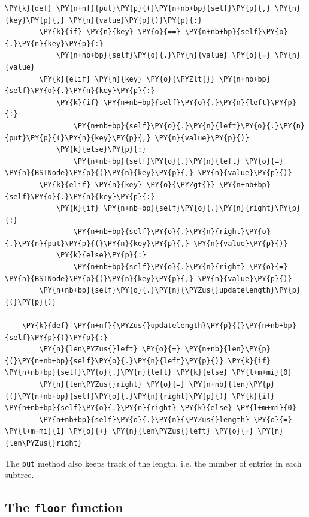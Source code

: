 \begin{Verbatim}[commandchars=\\\{\}]
    \PY{k}{def} \PY{n+nf}{put}\PY{p}{(}\PY{n+nb+bp}{self}\PY{p}{,} \PY{n}{key}\PY{p}{,} \PY{n}{value}\PY{p}{)}\PY{p}{:}
        \PY{k}{if} \PY{n}{key} \PY{o}{==} \PY{n+nb+bp}{self}\PY{o}{.}\PY{n}{key}\PY{p}{:}
            \PY{n+nb+bp}{self}\PY{o}{.}\PY{n}{value} \PY{o}{=} \PY{n}{value}
        \PY{k}{elif} \PY{n}{key} \PY{o}{\PYZlt{}} \PY{n+nb+bp}{self}\PY{o}{.}\PY{n}{key}\PY{p}{:}
            \PY{k}{if} \PY{n+nb+bp}{self}\PY{o}{.}\PY{n}{left}\PY{p}{:}
                \PY{n+nb+bp}{self}\PY{o}{.}\PY{n}{left}\PY{o}{.}\PY{n}{put}\PY{p}{(}\PY{n}{key}\PY{p}{,} \PY{n}{value}\PY{p}{)}
            \PY{k}{else}\PY{p}{:}
                \PY{n+nb+bp}{self}\PY{o}{.}\PY{n}{left} \PY{o}{=} \PY{n}{BSTNode}\PY{p}{(}\PY{n}{key}\PY{p}{,} \PY{n}{value}\PY{p}{)}
        \PY{k}{elif} \PY{n}{key} \PY{o}{\PYZgt{}} \PY{n+nb+bp}{self}\PY{o}{.}\PY{n}{key}\PY{p}{:}
            \PY{k}{if} \PY{n+nb+bp}{self}\PY{o}{.}\PY{n}{right}\PY{p}{:}
                \PY{n+nb+bp}{self}\PY{o}{.}\PY{n}{right}\PY{o}{.}\PY{n}{put}\PY{p}{(}\PY{n}{key}\PY{p}{,} \PY{n}{value}\PY{p}{)}
            \PY{k}{else}\PY{p}{:}
                \PY{n+nb+bp}{self}\PY{o}{.}\PY{n}{right} \PY{o}{=} \PY{n}{BSTNode}\PY{p}{(}\PY{n}{key}\PY{p}{,} \PY{n}{value}\PY{p}{)}
        \PY{n+nb+bp}{self}\PY{o}{.}\PY{n}{\PYZus{}updatelength}\PY{p}{(}\PY{p}{)}

    \PY{k}{def} \PY{n+nf}{\PYZus{}updatelength}\PY{p}{(}\PY{n+nb+bp}{self}\PY{p}{)}\PY{p}{:}
        \PY{n}{len\PYZus{}left} \PY{o}{=} \PY{n+nb}{len}\PY{p}{(}\PY{n+nb+bp}{self}\PY{o}{.}\PY{n}{left}\PY{p}{)} \PY{k}{if} \PY{n+nb+bp}{self}\PY{o}{.}\PY{n}{left} \PY{k}{else} \PY{l+m+mi}{0}
        \PY{n}{len\PYZus{}right} \PY{o}{=} \PY{n+nb}{len}\PY{p}{(}\PY{n+nb+bp}{self}\PY{o}{.}\PY{n}{right}\PY{p}{)} \PY{k}{if} \PY{n+nb+bp}{self}\PY{o}{.}\PY{n}{right} \PY{k}{else} \PY{l+m+mi}{0}
        \PY{n+nb+bp}{self}\PY{o}{.}\PY{n}{\PYZus{}length} \PY{o}{=} \PY{l+m+mi}{1} \PY{o}{+} \PY{n}{len\PYZus{}left} \PY{o}{+} \PY{n}{len\PYZus{}right}
\end{Verbatim}



The \texttt{put} method also keeps track of the length, i.e. the number of entries in each subtree.

\subsection{The \texttt{floor} function}


